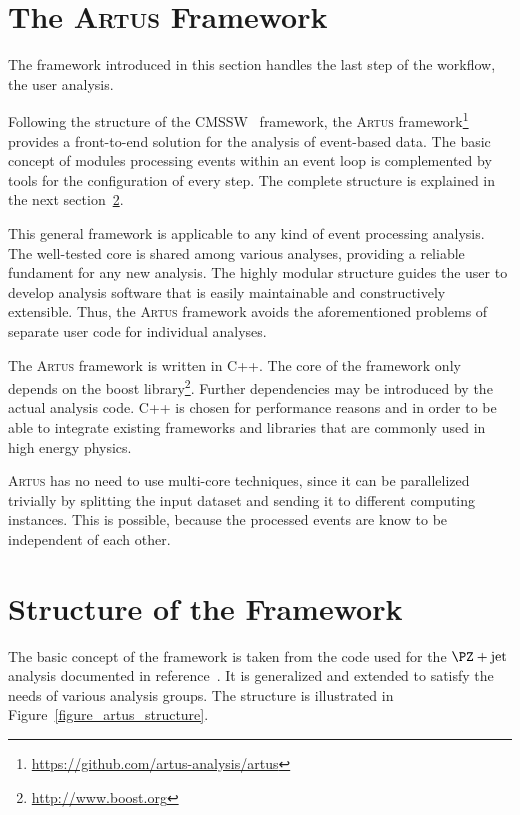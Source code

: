 \documentclass[3p]{elsarticle}
\newcommand{\software}[1]{\textsc{#1}\xspace}
\newcommand{\artus}{\software{Artus}}
\begin{document}
\section{The \artus Framework}
\label{section_artus_motivation}

The framework introduced in this section handles the last step of the workflow, the user analysis.

Following the structure of the CMSSW~\cite{cmssw} framework, the \artus framework\footnote{\url{https://github.com/artus-analysis/artus}} provides a front-to-end solution for the analysis of event-based data.
The basic concept of modules processing events within an event loop is complemented by tools for the configuration of every step.
The complete structure is explained in the next section~\ref{section_artus_structure}.

This general framework is applicable to any kind of event processing analysis.
The well-tested core is shared among various analyses, providing a reliable fundament for any new analysis.
The highly modular structure guides the user to develop analysis software that is easily maintainable and constructively extensible.
Thus, the \artus framework avoids the aforementioned problems of separate user code for individual analyses.

The \artus framework is written in C++.
The core of the framework only depends on the boost library\footnote{\url{http://www.boost.org}}.
Further dependencies may be introduced by the actual analysis code.
C++ is chosen for performance reasons and in order to be able to integrate existing frameworks and libraries that are commonly used in high energy physics.

\artus has no need to use multi-core techniques, since it can be parallelized trivially by splitting the input dataset and sending it to different computing instances.
This is possible, because the processed events are know to be independent of each other.

\section{Structure of the Framework}
\label{section_artus_structure}

The basic concept of the framework is taken from the code used for the $\PZ+\text{jet}$ analysis documented in reference~\cite{joram_phd}.
It is generalized and extended to satisfy the needs of various analysis groups.
The structure is illustrated in Figure~\ref{figure_artus_structure}.
\end{document}
